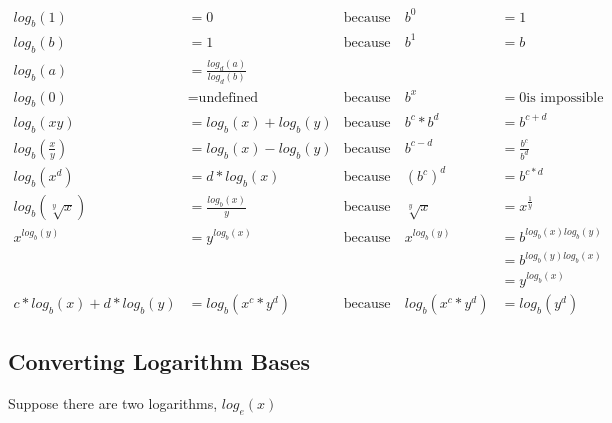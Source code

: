 \begin{align}
  log_b(1)           & = 0                         & \text{because} ~ & b^0              & = 1                    && \\
  log_b(b)           & = 1                         & \text{because} ~ & b^1              & = b                    && \\
  log_b(a)           & = \frac{log_d(a)}{log_d(b)} &                ~ &                  &                        && \\
  log_b(0)           & = \text{undefined}          & \text{because} ~ & b^x              & = 0 \text{is impossible} && \\
  log_b(xy)          & = log_b(x) + log_b(y)       & \text{because} ~ & b^c * b^d        & = b^{c+d}              && \\
  log_b(\frac{x}{y}) & = log_b(x) - log_b(y)       & \text{because} ~ & b^{c-d}          & = \frac{b^c}{b^d}      && \\
  log_b(x^d)         & = d * log_b(x)              & \text{because} ~ & (b^c)^d          & = b^{c*d}              && \\
  log_b(\sqrt[y]{x}) & = \frac{log_b(x)}{y}        & \text{because} ~ & \sqrt[y]{x}      & = x^{\frac{1}{y}}      && \\
  x^{log_b(y)}       & = y^{log_b(x)}              & \text{because} ~ & x^{log_b(y)}     & = b^{log_b(x)log_b(y)} && \\
                     &                             &                  &                  & = b^{log_b(y)log_b(x)} && \nonumber  \\
                     &                             &                  &                  & = y^{log_b(x)} \nonumber \\
  c * log_b(x) + d * log_b(y) & = log_b(x^c * y^d) & \text{because} ~ & log_b(x^c * y^d) & = log_b(y^d)           &&
\end{align}

\subsection{Converting Logarithm Bases}
Suppose there are two logarithms, $log_e(x)$

